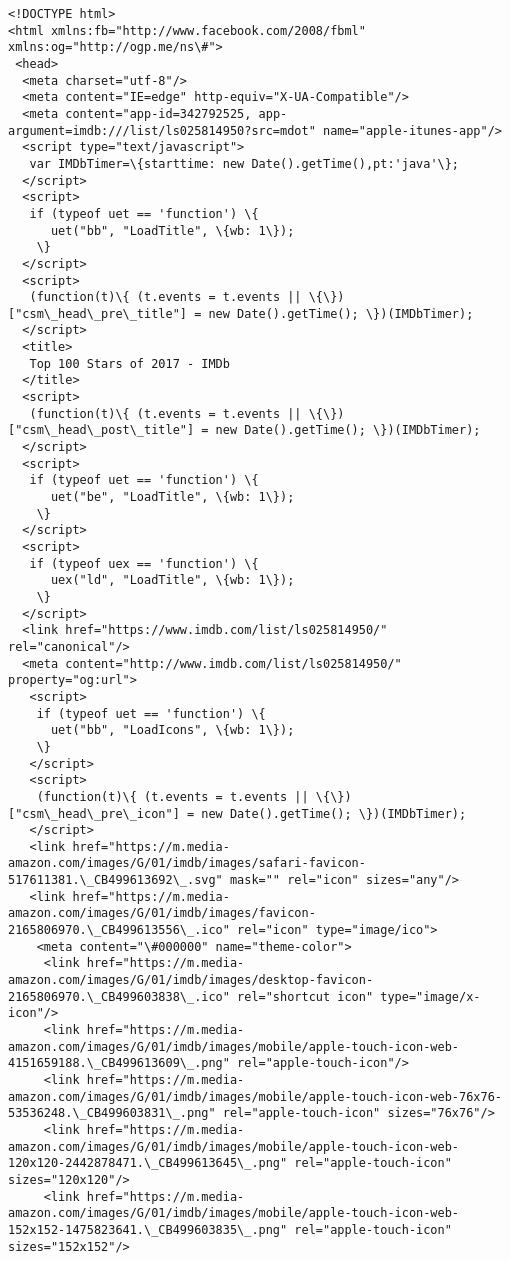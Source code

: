 \documentclass[11pt]{article}
\begin{document}
    \begin{Verbatim}[commandchars=\\\{\}]
<!DOCTYPE html>
<html xmlns:fb="http://www.facebook.com/2008/fbml" xmlns:og="http://ogp.me/ns\#">
 <head>
  <meta charset="utf-8"/>
  <meta content="IE=edge" http-equiv="X-UA-Compatible"/>
  <meta content="app-id=342792525, app-argument=imdb:///list/ls025814950?src=mdot" name="apple-itunes-app"/>
  <script type="text/javascript">
   var IMDbTimer=\{starttime: new Date().getTime(),pt:'java'\};
  </script>
  <script>
   if (typeof uet == 'function') \{
      uet("bb", "LoadTitle", \{wb: 1\});
    \}
  </script>
  <script>
   (function(t)\{ (t.events = t.events || \{\})["csm\_head\_pre\_title"] = new Date().getTime(); \})(IMDbTimer);
  </script>
  <title>
   Top 100 Stars of 2017 - IMDb
  </title>
  <script>
   (function(t)\{ (t.events = t.events || \{\})["csm\_head\_post\_title"] = new Date().getTime(); \})(IMDbTimer);
  </script>
  <script>
   if (typeof uet == 'function') \{
      uet("be", "LoadTitle", \{wb: 1\});
    \}
  </script>
  <script>
   if (typeof uex == 'function') \{
      uex("ld", "LoadTitle", \{wb: 1\});
    \}
  </script>
  <link href="https://www.imdb.com/list/ls025814950/" rel="canonical"/>
  <meta content="http://www.imdb.com/list/ls025814950/" property="og:url">
   <script>
    if (typeof uet == 'function') \{
      uet("bb", "LoadIcons", \{wb: 1\});
    \}
   </script>
   <script>
    (function(t)\{ (t.events = t.events || \{\})["csm\_head\_pre\_icon"] = new Date().getTime(); \})(IMDbTimer);
   </script>
   <link href="https://m.media-amazon.com/images/G/01/imdb/images/safari-favicon-517611381.\_CB499613692\_.svg" mask="" rel="icon" sizes="any"/>
   <link href="https://m.media-amazon.com/images/G/01/imdb/images/favicon-2165806970.\_CB499613556\_.ico" rel="icon" type="image/ico">
    <meta content="\#000000" name="theme-color">
     <link href="https://m.media-amazon.com/images/G/01/imdb/images/desktop-favicon-2165806970.\_CB499603838\_.ico" rel="shortcut icon" type="image/x-icon"/>
     <link href="https://m.media-amazon.com/images/G/01/imdb/images/mobile/apple-touch-icon-web-4151659188.\_CB499613609\_.png" rel="apple-touch-icon"/>
     <link href="https://m.media-amazon.com/images/G/01/imdb/images/mobile/apple-touch-icon-web-76x76-53536248.\_CB499603831\_.png" rel="apple-touch-icon" sizes="76x76"/>
     <link href="https://m.media-amazon.com/images/G/01/imdb/images/mobile/apple-touch-icon-web-120x120-2442878471.\_CB499613645\_.png" rel="apple-touch-icon" sizes="120x120"/>
     <link href="https://m.media-amazon.com/images/G/01/imdb/images/mobile/apple-touch-icon-web-152x152-1475823641.\_CB499603835\_.png" rel="apple-touch-icon" sizes="152x152"/>

\end{Verbatim}
\end{document}
